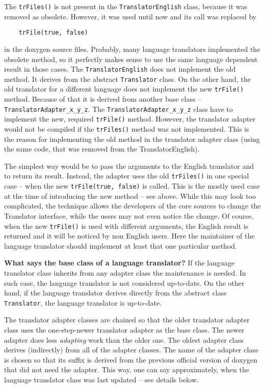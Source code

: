 The {\tt trFiles()} is not present in the {\tt TranslatorEnglish} class, because it was removed as obsolete. However, it was used until now and its call was replaced by



\footnotesize\begin{verbatim}
    trFile(true, false)
\end{verbatim}
\normalsize


in the doxygen source files. Probably, many language translators implemented the obsolete method, so it perfectly makes sense to use the same language dependent result in those cases. The {\tt TranslatorEnglish} does not implement the old method. It derives from the abstract {\tt Translator} class. On the other hand, the old translator for a different language does not implement the new {\tt trFile()} method. Because of that it is derived from another base class -- {\tt TranslatorAdapter\_\-x\_\-y\_\-z}. The {\tt TranslatorAdapter\_\-x\_\-y\_\-z} class have to implement the new, required {\tt trFile()} method. However, the translator adapter would not be compiled if the {\tt trFiles()} method was not implemented. This is the reason for implementing the old method in the translator adapter class (using the same code, that was removed from the TranslatorEnglish).

The simplest way would be to pass the arguments to the English translator and to return its result. Instead, the adapter uses the old {\tt trFiles()} in one special case -- when the new {\tt trFile(true,~false)} is called. This is the mostly used case at the time of introducing the new method -- see above. While this may look too complicated, the technique allows the developers of the core sources to change the Translator interface, while the users may not even notice the change. Of course, when the new {\tt trFile()} is used with different arguments, the English result is returned and it will be noticed by non English users. Here the maintainer of the language translator should implement at least that one particular method.

{\bf What says the base class of a language translator?} If the language translator class inherits from any adapter class the maintenance is needed. In such case, the language translator is not considered up-to-date. On the other hand, if the language translator derives directly from the abstract class {\tt Translator}, the language translator is up-to-date.

The translator adapter classes are chained so that the older translator adapter class uses the one-step-newer translator adapter as the base class. The newer adapter does less {\em adapting\/} work than the older one. The oldest adapter class derives (indirectly) from all of the adapter classes. The name of the adapter class is chosen so that its suffix is derived from the previous official version of doxygen that did not need the adapter. This way, one can say approximately, when the language translator class was last updated -- see details below.


